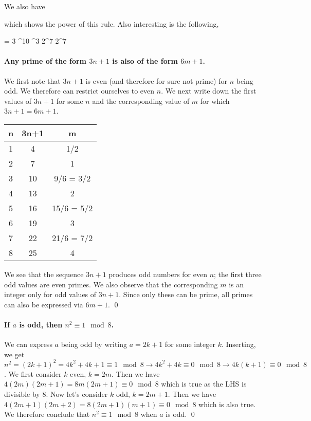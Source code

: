 We also have

      
\eee

which shows the power of this rule. Also interesting is the following,

 = 3 ^{10}   ^3 2^7    2^7   
\eee


\paragraph{Any prime of the form $3n+1$ is also of the form $6m+1$.} We first note that $3n+1$ is even (and therefore for sure not prime) for $n$ being odd. We therefore can restrict ourselves to even $n$. We next write down the first values of $3n+1$ for some $n$ and the corresponding value of $m$ for which $3n+1 = 6m+1$.

\vspace{3mm}

\begin{tabular}{ccc}
    n & 3n+1 & m \\ \hline
    1 & 4    & 1/2 \\
    2 & 7    & 1    \\
    3 & 10   & 9/6 = 3/2 \\
    4 & 13   & 2 \\
    5 & 16   & 15/6 = 5/2 \\
    6 & 19   & 3 \\
    7 & 22   & 21/6 = 7/2 \\
    8 & 25   & 4
\end{tabular}

\vspace{3mm}

We see that the sequence $3n+1$ produces odd numbers for even $n$; the first three odd values are even primes. We also observe that the corresponding $m$ is an integer only for odd values of $3n+1$. Since only these can be prime, all primes can also be expressed via $6m+1$. \qed

\paragraph{If $a$ is odd, then $n^2 \equiv 1 \mod 8$.} We can express $a$ being odd by writing $a = 2k+1$ for some integer $k$. Inserting, we get $n^2 = (2k+1)^2 = 4k^2 + 4k + 1 \equiv 1 \mod 8 \rightarrow 4k^2 + 4k \equiv 0 \mod 8 \rightarrow 4k(k+1) \equiv 0 \mod 8$. We first consider $k$ even, $k = 2m$. Then we have $4(2m)(2m+1) = 8m(2m+1) \equiv 0 \mod 8$ which is true as the LHS is divisible by $8$. Now let's consider $k$ odd, $k = 2m+1$. Then we have $4(2m+1)(2m+2) = 8(2m+1)(m+1) \equiv 0 \mod 8$ which is also true. We therefore conclude that $n^2 \equiv 1 \mod 8$ when $a$ is odd. \qed

